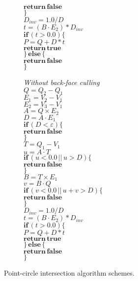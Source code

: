 \begin{figure}[htbp]
\begin{subfigure}[t]{.4\linewidth}
		\quad $\mathbf{return \, false}$\\
		$\}$\\
		$D_{inv} = 1.0 / D$\\
		$t = (B \cdot E_2) * D_{inv}$\\
		$\mathbf{if} \, (t > 0.0) \{$\\
		\quad $P = Q + D * t$\\
		\quad $\mathbf{return \, true}$\\
		$\} \, \mathbf{else} \, \{$\\
		\quad $\mathbf{return \, false}$\\
		$\}$\\
	\end{subfigure}
\hfill
	\begin{subfigure}[t]{.4\textwidth}
		\raggedright
		\textit{Without back-face culling}\\
		\vspace{.5em}
		$Q = Q_2 - Q_1$\\
		$E_1 = V_2 - V_1$\\
		$E_2 = V_3 - V_1$\\
		$A = Q \times E_2$\\
		$D = A \cdot E_1$\\
		$\mathbf{if} \, (D < \varepsilon) \{$\\
		\quad $\mathbf{return \, false}$\\
		$\}$\\
		$T = Q_1 - V_1$\\
		$u = A \cdot T$\\
		$\mathbf{if} \, (u < 0.0 \, || \, u > D) \{$\\
		\quad $\mathbf{return \, false}$\\
		$\}$\\
		$B = T \times E_1$\\
		$v = B \cdot Q$\\
		$\mathbf{if} \, (v < 0.0 \, || \, u + v > D) \{$\\
		\quad \quad $\mathbf{return \, false}$\\
		$\}$\\
		$D_{inv} = 1.0 / D$\\
		$t = (B \cdot E_2) * D_{inv}$\\
		$\mathbf{if} \, (t > 0.0) \{$\\
		\quad $P = Q + D * t$\\
		\quad $\mathbf{return \, true}$\\
		$\} \, \mathbf{else} \, \{$\\
		\quad $\mathbf{return \, false}$\\
		$\}$\\
	\end{subfigure}
\hfill
\caption{Point-circle intersection algorithm schemes.}
\end{figure}